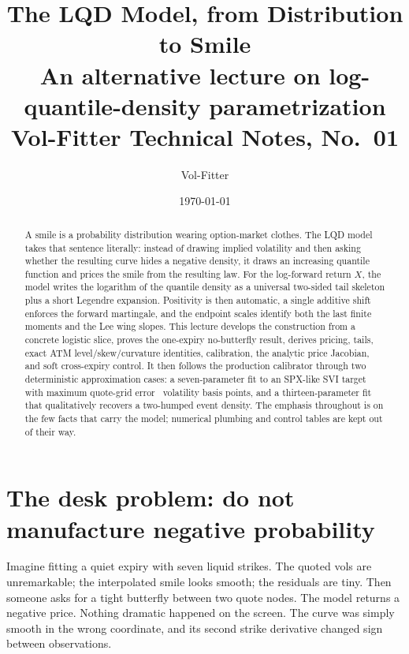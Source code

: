 \documentclass[11pt]{article}
\title{\textbf{The LQD Model, from Distribution to Smile}\\[2pt]
\large An alternative lecture on log-quantile-density parametrization\\[2pt]
\normalsize Vol-Fitter Technical Notes, No.~01}
\author{Vol-Fitter}
\date{\today}
\begin{document}
\maketitle




\begin{abstract}
A smile is a probability distribution wearing option-market clothes.  The LQD
model takes that sentence literally: instead of drawing implied volatility and
then asking whether the resulting curve hides a negative density, it draws an
increasing quantile function and prices the smile from the resulting law.  For
the log-forward return $X$, the model writes the logarithm of the quantile
density as a universal two-sided tail skeleton plus a short Legendre expansion.
Positivity is then automatic, a single additive shift enforces the forward
martingale, and the endpoint scales identify both the last finite moments and
the Lee wing slopes.  This lecture develops the construction from a concrete
logistic slice, proves the one-expiry no-butterfly result, derives pricing,
tails, exact ATM level/skew/curvature identities, calibration, the analytic
price Jacobian, and soft cross-expiry control.  It then follows the production
calibrator through two deterministic approximation cases: a seven-parameter
fit to an SPX-like SVI target with maximum quote-grid error
\lqdsvimaxerr\ volatility basis points, and a thirteen-parameter fit that
qualitatively recovers a two-humped event density.  The emphasis throughout is
on the few facts that carry the model; numerical plumbing and control tables
are kept out of their way.
\end{abstract}

\tableofcontents
\newpage

\section{The desk problem: do not manufacture negative probability}
\label{sec:desk}

Imagine fitting a quiet expiry with seven liquid strikes.  The quoted vols are
unremarkable; the interpolated smile looks smooth; the residuals are tiny.
Then someone asks for a tight butterfly between two quote nodes.  The model
returns a negative price.  Nothing dramatic happened on the screen.  The curve
was simply smooth in the wrong coordinate, and its second strike derivative
changed sign between observations.
\end{document}
